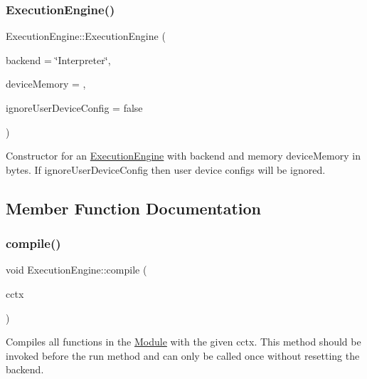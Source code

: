 \subsubsection{\texorpdfstring{Execution\+Engine()}{ExecutionEngine()}}
{\footnotesize\ttfamily Execution\+Engine\+::\+Execution\+Engine (\begin{DoxyParamCaption}\item[{llvm\+::\+String\+Ref}]{backend = {\ttfamily \char`\"{}Interpreter\char`\"{}},  }\item[{uint64\+\_\+t}]{device\+Memory = {},  }\item[{bool}]{ignore\+User\+Device\+Config = {\ttfamily false} }\end{DoxyParamCaption})}

Constructor for an \hyperlink{classglow_1_1_execution_engine}{Execution\+Engine} with {\ttfamily backend} and memory {\ttfamily device\+Memory} in bytes. If {\ttfamily ignore\+User\+Device\+Config} then user device configs will be ignored. 

\subsection{Member Function Documentation}
\mbox{\label{classglow_1_1_execution_engine_aba8c48da8a7a8868a4d42128ac2f05fe}} 
\subsubsection{\texorpdfstring{compile()}{compile()}\hspace{0.1cm}{\footnotesize\ttfamily [1/2]}}
{\footnotesize\ttfamily void Execution\+Engine\+::compile (\begin{DoxyParamCaption}\item[{\hyperlink{structglow_1_1_compilation_context}{Compilation\+Context} \&}]{cctx }\end{DoxyParamCaption})}

Compiles all functions in the \hyperlink{classglow_1_1_module}{Module} with the given {\ttfamily cctx}. This method should be invoked before the run method and can only be called once without resetting the backend. \mbox{\label{classglow_1_1_execution_engine_a5a719c4411a5c8389e7bf656e37a7602}} 
